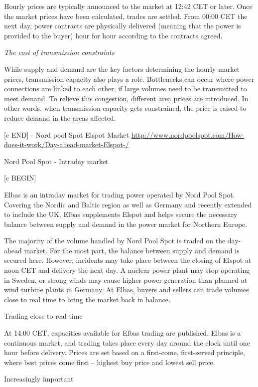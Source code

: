 Hourly prices are typically announced to the market at 12:42 CET or later. Once the market prices have been calculated, trades are settled. From 00:00 CET the next day, power contracts are physically delivered (meaning that the power is provided to the buyer) hour for hour according to the contracts agreed.

\emph{The cost of transmission constraints}

While supply and demand are the key factors determining the hourly market prices, transmission capacity also plays a role. Bottlenecks can occur where power connections are linked to each other, if large volumes need to be transmitted to meet demand. To relieve this congestion, different area prices are introduced. In other words, when transmission capacity gets constrained, the price is raised to reduce demand in the areas affected.

[c END] - Nord pool Spot Elspot Market \url{http://www.nordpoolspot.com/How-does-it-work/Day-ahead-market-Elspot-/}



Nord Pool Spot - Intraday market

[c BEGIN]

Elbas  is an intraday market for trading power operated by Nord Pool Spot. Covering the Nordic and Baltic region as well as Germany and recently extended to include the UK, Elbas supplements Elspot and helps secure the necessary balance between supply and demand in the power market for Northern Europe.

The majority of the volume handled by Nord Pool Spot is traded on the day-ahead market. For the most part, the balance between supply and demand is secured here. However, incidents may take place between the closing of Elspot at noon CET and delivery the next day. A nuclear power plant may stop operating in Sweden, or strong winds may cause higher power generation than planned at wind turbine plants in Germany. At Elbas, buyers and sellers can trade volumes close to real time to bring the market back in balance.

Trading close to real time

At 14:00 CET, capacities available for Elbas trading are published. Elbas is a continuous market, and trading takes place every day around the clock until one hour before delivery. Prices are set based on a first-come, first-served principle, where best prices come first – highest buy price and lowest sell price.

Increasingly important

